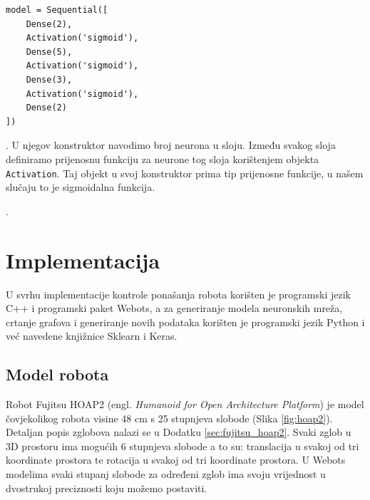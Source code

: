 \documentclass[times, utf8, zavrsni]{fer}
\begin{document}
\begin{verbatim}
model = Sequential([
    Dense(2),
    Activation('sigmoid'),
    Dense(5),
    Activation('sigmoid'),
    Dense(3),
    Activation('sigmoid'),
    Dense(2)
])
\end{verbatim}
. U njegov konstruktor navodimo broj neurona u sloju. Između svakog sloja definiramo prijenosnu funkciju za neurone tog sloja korištenjem objekta \texttt{Activation}. Taj objekt u svoj konstruktor prima tip prijenosne funkcije, u našem slučaju to je sigmoidalna funkcija.

. 


\chapter{Implementacija}
U svrhu implementacije kontrole ponašanja robota korišten je programski jezik C++ i programski paket Webots, a za generiranje modela neuronskih mreža, crtanje grafova i generiranje novih podataka korišten je programski jezik Python i već navedene knjižnice Sklearn i Keras.

\section{Model robota}
Robot Fujitsu HOAP2 (engl. \textit{Humanoid for Open Architecture Platform}) je model čovjekolikog robota visine 48 cm s 25 stupnjeva slobode (Slika \ref{fig:hoap2}). Detaljan popis zglobova nalazi se u Dodatku \ref{sec:fujitsu_hoap2}. Svaki zglob u 3D prostoru ima mogućih 6 stupnjeva slobode a to su: translacija u svakoj od tri koordinate prostora te rotacija u svakoj od tri koordinate prostora. U Webots modelima svaki stupanj slobode za određeni zglob ima svoju vrijednost u dvostrukoj preciznosti koju možemo postaviti.
\end{document}
